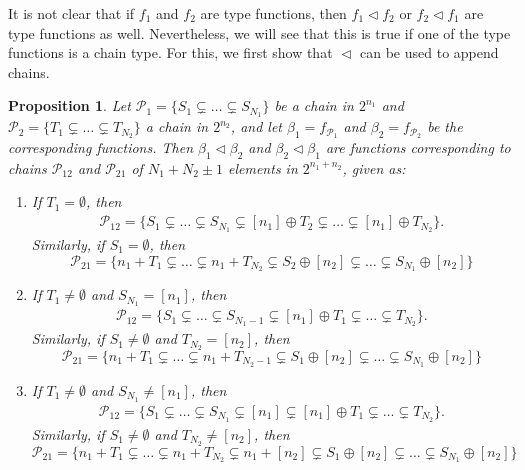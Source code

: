 \documentclass[12pt]{article}
\newtheorem{prop}{Proposition}
\theoremstyle{definition}
\theoremstyle{remark}
\def\Pe{\mathcal P}
\def\vtl{\vartriangleleft}
\begin{document}
It is not clear that if $f_1$ and $f_2$ are type functions, then $f_1\vtl f_2$ or $f_2\vtl
f_1$ are type functions as well. Nevertheless, we will see that this is true if one of
the type functions is a chain type.
For this, we first show that $\vtl$ can be used to append chains.



\begin{prop}\label{prop:append_chains} Let  
$\Pe_1=\{S_1\subsetneq \dots\subsetneq S_{N_1}\}$ be a chain in  $2^{n_1}$ and
$\Pe_2=\{T_1\subsetneq \dots \subsetneq T_{N_2}\}$ a chain in $2^{n_2}$, and let
  $\beta_1=f_{\Pe_1}$ and $\beta_2=f_{\Pe_2}$ be the corresponding functions. Then 
$\beta_1\vtl \beta_2$ and $\beta_2\vtl \beta_1$ are functions corresponding to
chains $\Pe_{12}$ and $\Pe_{21}$ of $N_1+N_2\pm 1$ elements in $2^{n_1+n_2}$, given as:
\begin{enumerate}
\item[(a)] If $T_1=\emptyset$, then 
\begin{align*}
\Pe_{12}=\{S_1\subsetneq\dots\subsetneq S_{N_1}\subsetneq [n_1]\oplus T_2\subsetneq \dots
\subsetneq [n_1]\oplus T_{N_2}\}.
\end{align*}
Similarly, if $S_1=\emptyset$, then
\[
\Pe_{21}=\{n_1+T_1\subsetneq \dots \subsetneq n_1+T_{N_2}\subsetneq S_2\oplus
[n_2]\subsetneq \dots \subsetneq  S_{N_1}\oplus[n_2]\}
\]
\item[(b)] If $T_1\ne\emptyset$ and $S_{N_1}= [n_1]$, then 
\begin{align*}
\Pe_{12}=\{S_1\subsetneq\dots\subsetneq S_{N_1-1}\subsetneq [n_1]\oplus T_1\subsetneq \dots
\subsetneq T_{N_2}\}.
\end{align*}
Similarly, if $S_1\ne \emptyset$ and $T_{N_2}=[n_2]$, then
\[
\Pe_{21}=\{n_1+T_1\subsetneq \dots \subsetneq n_1+T_{N_2-1}\subsetneq S_1\oplus
[n_2]\subsetneq \dots \subsetneq  S_{N_1}\oplus[n_2]\}
\]
\item[(c)] If $T_1\ne\emptyset$ and $S_{N_1}\ne [n_1]$, then 
\begin{align*}
\Pe_{12}=\{S_1\subsetneq\dots\subsetneq S_{N_1}\subsetneq [n_1]\subsetneq [n_1]\oplus T_1\subsetneq \dots
\subsetneq T_{N_2}\}.
\end{align*}
Similarly, if $S_1\ne \emptyset$ and $T_{N_2}\ne [n_2]$, then
\[
\Pe_{21}=\{n_1+T_1\subsetneq \dots \subsetneq n_1+T_{N_2}\subsetneq n_1+[n_2]\subsetneq S_1\oplus
[n_2]\subsetneq \dots \subsetneq  S_{N_1}\oplus[n_2]\}
\]

\end{enumerate}


\end{prop}
\end{document}
